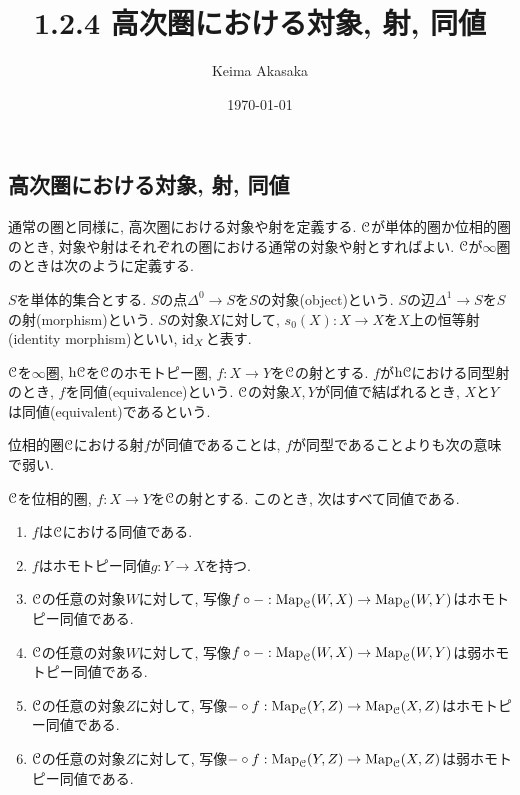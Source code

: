 \documentclass[uplatex, a4paper, 14Q, dvipdfmx]{jsreport}
\title{1.2.4 高次圏における対象, 射, 同値}
\author{Keima Akasaka}
\date{\today}
\begin{document}

\setcounter{chapter}{1}
\setcounter{section}{2} 
\setcounter{subsection}{3}   
\setcounter{subsubsection}{1}

\subsection{高次圏における対象, 射, 同値}

通常の圏と同様に, 高次圏における対象や射を定義する. 
$\mathcal{C}$が単体的圏か位相的圏のとき, 対象や射はそれぞれの圏における通常の対象や射とすればよい. 
$\mathcal{C}$が$\infty$圏のときは次のように定義する. 

$S$を単体的集合とする. 
$S$の点$\Delta^0 \to S$を$S$の対象(object)という.
$S$の辺$\Delta^1 \to S$を$S$の射(morphism)という.
$S$の対象$X$に対して, $s_0(X) : X \to X$を$X$上の恒等射(identity morphism)といい, $\mathrm{id}_X$と表す.

$\mathcal{C}$を$\infty$圏, $\mathrm{h}\mathcal{C}$を$\mathcal{C}$のホモトピー圏, $f : X \to Y$を$\mathcal{C}$の射とする. 
$f$が$\mathrm{h}\mathcal{C}$における同型射のとき, $f$を同値(equivalence)という.
$\mathcal{C}$の対象$X,Y$が同値で結ばれるとき, $X$と$Y$は同値(equivalent)であるという.

位相的圏$\mathcal{C}$における射$f$が同値であることは, $f$が同型であることよりも次の意味で弱い. 

\begin{proposition} \label{prop.1.2.4.1}
  $\mathcal{C}$を位相的圏, $f : X \to Y$を$\mathcal{C}$の射とする. 
  このとき, 次はすべて同値である.
  \begin{enumerate}
    \item $f$は$\mathcal{C}$における同値である. 
    \item $f$はホモトピー同値$g : Y \to X$を持つ. 
    \item $\mathcal{C}$の任意の対象$W$に対して, 写像$f \circ - : \mathrm{Map}_{\mathcal{C}}(W,X) \to \mathrm{Map}_{\mathcal{C}}(W,Y)$はホモトピー同値である. 
    \item $\mathcal{C}$の任意の対象$W$に対して, 写像$f \circ - : \mathrm{Map}_{\mathcal{C}}(W,X) \to \mathrm{Map}_{\mathcal{C}}(W,Y)$は弱ホモトピー同値である. 
    \item $\mathcal{C}$の任意の対象$Z$に対して, 写像$- \circ f : \mathrm{Map}_{\mathcal{C}}(Y,Z) \to \mathrm{Map}_{\mathcal{C}}(X,Z)$はホモトピー同値である.
    \item $\mathcal{C}$の任意の対象$Z$に対して, 写像$- \circ f : \mathrm{Map}_{\mathcal{C}}(Y,Z) \to \mathrm{Map}_{\mathcal{C}}(X,Z)$は弱ホモトピー同値である. 
  \end{enumerate}
\end{proposition}
\end{document}

